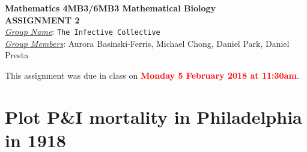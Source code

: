 \documentclass[12pt]{article}\usepackage[]{graphicx}\usepackage[]{color}
\begin{document}
\begin{center}
{\bf Mathematics 4MB3/6MB3 Mathematical Biology\\
 ASSIGNMENT 2}\\
\medskip
\underline{\emph{Group Name}}: \texttt{{\color{blue}The Infective Collective}}\\
\medskip
\underline{\emph{Group Members}}: {\color{blue}Aurora Basinski-Ferris, Michael Chong, Daniel Park, Daniel Presta}
\end{center}

\bigskip
\noindent
This assignment was due in class on \textcolor{red}{\bf Monday 5 February 2018 at 11:30am}.

\section{Plot P\&I mortality in Philadelphia in 1918}
\end{document}
